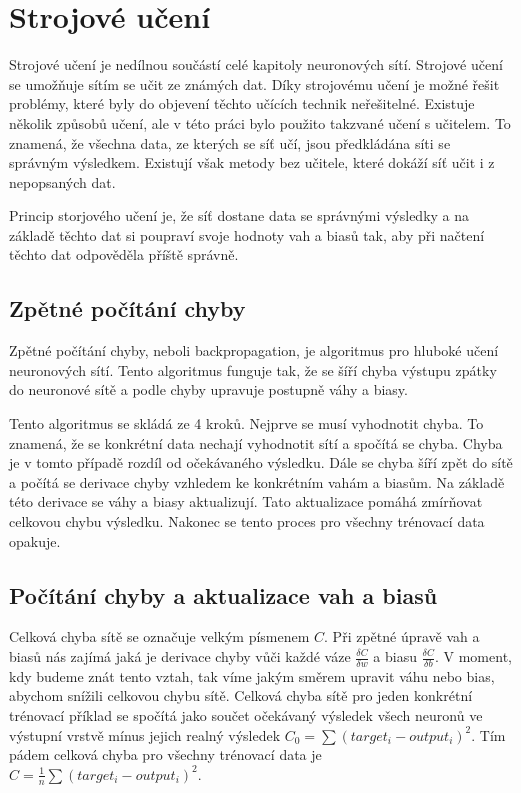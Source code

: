 \section{Strojové učení} \label{strojove_uceni}
Strojové učení je nedílnou součástí celé kapitoly neuronových sítí. Strojové učení se umožňuje sítím se učit ze známých dat.
Díky strojovému učení je možné řešit problémy, které byly do objevení těchto učících technik neřešitelné.
Existuje několik způsobů učení, ale v této práci bylo použito takzvané učení s učitelem.
To znamená, že všechna data, ze kterých se síť učí, jsou předkládána síti se správným výsledkem.
Existují však metody bez učitele, které dokáží síť učit i z nepopsaných dat.

Princip storjového učení je, že síť dostane data se správnými výsledky a na základě těchto dat si poupraví svoje hodnoty vah a biasů tak,
aby při načtení těchto dat odpověděla příště správně.

\subsection{Zpětné počítání chyby}
Zpětné počítání chyby\cite{backpropagation}, neboli backpropagation, je algoritmus pro hluboké učení neuronových sítí.
Tento algoritmus funguje tak, že se šíří chyba výstupu zpátky do neuronové sítě a podle chyby upravuje postupně váhy a biasy.

Tento algoritmus se skládá ze 4 kroků. Nejprve se musí vyhodnotit chyba. To znamená, že se konkrétní data nechají vyhodnotit sítí a spočítá se chyba.
Chyba je v tomto případě rozdíl od očekávaného výsledku. Dále se chyba šíří zpět do sítě a počítá se derivace chyby vzhledem ke konkrétním vahám a biasům.
Na základě této derivace se váhy a biasy aktualizují. Tato aktualizace pomáhá zmírňovat celkovou chybu výsledku. Nakonec se tento proces pro všechny trénovací data opakuje.

\subsection{Počítání chyby a aktualizace vah a biasů}
Celková chyba sítě se označuje velkým písmenem \(C\). Při zpětné úpravě vah a biasů nás zajímá jaká je derivace chyby vůči každé váze \(\frac{\delta C}{\delta w}\) a biasu \(\frac{\delta C}{\delta b}\).
V moment, kdy budeme znát tento vztah, tak víme jakým směrem upravit váhu nebo bias, abychom snížili celkovou chybu sítě.
Celková chyba sítě pro jeden konkrétní trénovací příklad se spočítá jako součet očekávaný výsledek všech neuronů ve výstupní vrstvě mínus jejich realný výsledek \(C_0 = \sum (target_i - output_i)^2 \).
Tím pádem celková chyba pro všechny trénovací data je \(C = \frac{1}{n}\sum (target_i - output_i)^2 \).

